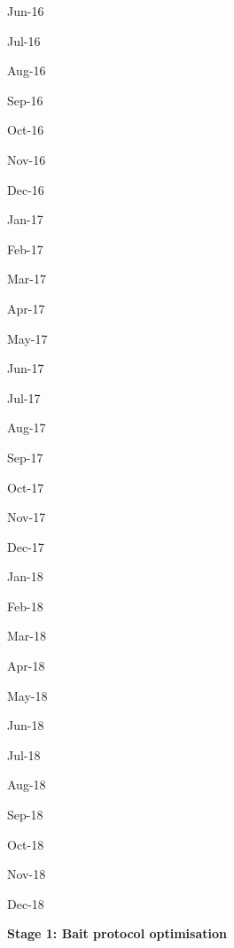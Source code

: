 \documentclass[version=last,
    paper=a4,                               %
    10pt,                                   %
    dvipsnames,
    oneside,                              %
    headings=openany,                       %
    open=any,
    BCOR=7mm,                               %
    DIV=15,     %
]{scrbook}
\begin{document}
Jun-16

Jul-16

Aug-16

Sep-16

Oct-16

Nov-16

Dec-16

Jan-17

Feb-17

Mar-17

Apr-17

May-17

Jun-17

Jul-17

Aug-17

Sep-17

Oct-17

Nov-17

Dec-17

Jan-18

Feb-18

Mar-18

Apr-18

May-18

Jun-18

Jul-18

Aug-18

Sep-18

Oct-18

Nov-18

Dec-18

\textbf{Stage 1: Bait protocol optimisation}

~

~

~

~

~

~

~

~

~

~

~

~

~

~

~

~

~

~

~

~

~

~

~

~
\end{document}
